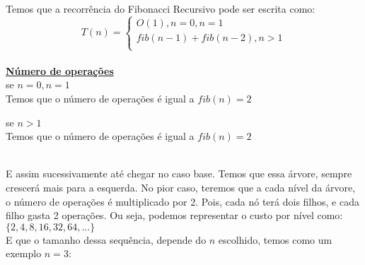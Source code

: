 \documentclass[a4paper, 12pt]{article}
\begin{document}
Temos que a recorrência do Fibonacci Recursivo pode ser escrita como:
\begin{equation}
T(n) = \left\{ \begin{array}{l}
O(1), n=0, n=1 \\
fib(n-1)+fib(n-2), n>1\\
\end{array}
\right.
\end{equation} \\

\large\underline{\bf Número de operações} \\

se $n = 0, n = 1$\\
Temos que o número de operações é igual a $fib(n) = 2$

se $n>1$\\
Temos que o número de operações é igual a $fib(n) = 2$ \\

 \\

E assim sucessivamente até chegar no caso base. Temos que essa árvore, sempre crescerá mais para a esquerda. No pior caso, teremos que a cada nível da árvore, o número de operações é multiplicado por 2. Pois, cada nó terá dois filhos, e cada filho gasta 2 operações. Ou seja, podemos representar o custo por nível como: \\
$\{2,4,8,16,32,64,...\}$ \\

E que o tamanho dessa sequência, depende do $n$ escolhido, temos como um exemplo $n=3$: \\

 \\
\end{document}
